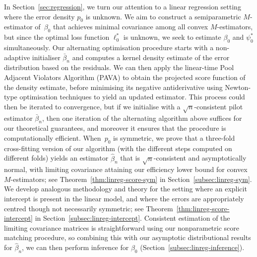 \documentclass[a4paper]{article}
\theoremstyle{definition}
\begin{document}
In Section~\ref{sec:regression}, we turn our attention to a linear regression setting where the error density $p_0$ is unknown. 
We aim to construct a semiparametric $M$-estimator of~$\beta_0$ that achieves minimal covariance among all convex $M$-estimators, but since the optimal loss function $\ell_0^*$ is unknown, we seek to estimate $\beta_0$ and $\psi_0^*$ simultaneously. Our alternating optimisation procedure starts with a non-adaptive initialiser $\bar{\beta}_n$ and computes a kernel density estimate of the error distribution based on the residuals.  We can then apply the linear-time Pool Adjacent Violators Algorithm (PAVA) to obtain the projected score function of the density estimate, before minimising its negative antiderivative using Newton-type optimisation techniques to yield an updated estimator.  This process could then be iterated to convergence, but if we initialise with a $\sqrt{n}$-consistent pilot estimator $\bar{\beta}_n$, then one iteration of the alternating algorithm above suffices for our theoretical guarantees, and moreover it ensures that the procedure is computationally efficient. When~$p_0$ is symmetric, we prove that a three-fold cross-fitting version of our algorithm (with the different steps computed on different folds) yields an estimator $\hat{\beta}_n$ that is $\sqrt{n}$-consistent and asymptotically normal, with limiting covariance attaining our efficiency lower bound for convex $M$-estimators; see Theorem~\ref{thm:linreg-score-sym} in Section~\ref{subsec:linreg-sym}. We develop analogous methodology and theory for the setting where an explicit intercept is present in the linear model, and where the errors are appropriately centred though not necessarily symmetric; see Theorem~\ref{thm:linreg-score-intercept} in Section~\ref{subsec:linreg-intercept}. Consistent estimation of the limiting covariance matrices is straightforward using our nonparametric score matching procedure, so combining this with our asymptotic distributional results for $\hat{\beta}_n$, we can then perform inference for $\beta_0$ (Section~\ref{subsec:linreg-inference}).    
\end{document}
